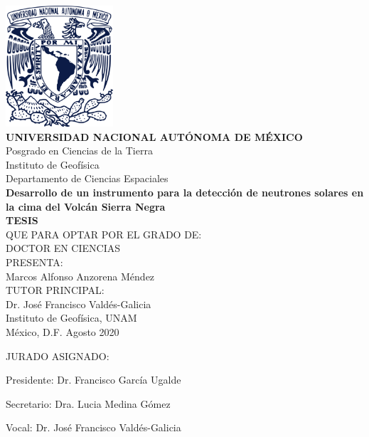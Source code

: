 \begin{titlepage} 
  	
\begin{center}

	\vspace{-1cm}
  	\includegraphics[height=4.5cm]{unam.pdf}\\[20pt]
	\textbf{\Large UNIVERSIDAD NACIONAL AUTÓNOMA DE MÉXICO}\\
	\large Posgrado en Ciencias de la Tierra\\		
	\large Instituto de Geofísica\\
	\large Departamento de Ciencias Espaciales\\[35pt]
	\textbf{\Large Desarrollo de un instrumento para la detección de neutrones solares en la cima
	del Volcán Sierra Negra}\\[40pt]
	\textbf{\Large TESIS}\\[10pt]
  	\large QUE PARA OPTAR POR EL GRADO DE:\\
  	\large DOCTOR EN CIENCIAS\\[25pt]
  	\large PRESENTA:\\
	\large  Marcos Alfonso Anzorena Méndez\\[30pt]
  	\large TUTOR PRINCIPAL:\\
  	\large  Dr. José Francisco Valdés-Galicia\\
  	\large  Instituto de Geofísica, UNAM\\[35pt]
  	México, D.F. Agosto 2020
  			
\end{center}

\newpage

\thispagestyle{empty}
\setlength{\parskip}{5pt}

	\Large JURADO ASIGNADO:
	
	\vspace*{35pt}
	\large Presidente: Dr. Francisco García Ugalde
	
	\large Secretario: Dra. Lucia Medina Gómez
	
	\large Vocal: Dr. José Francisco Valdés-Galicia
	

\end{titlepage}
